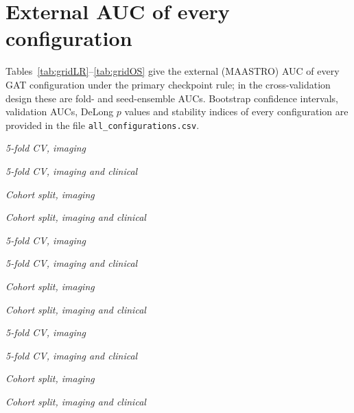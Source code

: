 \documentclass[11pt]{article}
\begin{document}
\section{External AUC of every configuration}

Tables~\ref{tab:gridLR}--\ref{tab:gridOS} give the external (MAASTRO) AUC of every GAT configuration under the primary checkpoint rule; in the cross-validation design these are fold- and seed-ensemble AUCs. Bootstrap confidence intervals, validation AUCs, DeLong $p$ values and stability indices of every configuration are provided in the file \texttt{all\_configurations.csv}.

\newcommand{\gridblock}[2]{\par\smallskip\noindent\textit{#1}\par\smallskip{\small}\par}

\begin{table}[!htb]
\centering
\caption{Locoregional recurrence: external AUC by feature-selection strategy and topology.}\label{tab:gridLR}
\gridblock{5-fold CV, imaging}{tabS_grid_LR_cv_img}
\gridblock{5-fold CV, imaging and clinical}{tabS_grid_LR_cv_clin}
\gridblock{Cohort split, imaging}{tabS_grid_LR_coh_img}
\gridblock{Cohort split, imaging and clinical}{tabS_grid_LR_coh_clin}
\end{table}

\begin{table}[!htb]
\centering
\caption{Distant metastasis: external AUC by feature-selection strategy and topology.}\label{tab:gridDM}
\gridblock{5-fold CV, imaging}{tabS_grid_DM_cv_img}
\gridblock{5-fold CV, imaging and clinical}{tabS_grid_DM_cv_clin}
\gridblock{Cohort split, imaging}{tabS_grid_DM_coh_img}
\gridblock{Cohort split, imaging and clinical}{tabS_grid_DM_coh_clin}
\end{table}

\begin{table}[!htb]
\centering
\caption{Overall survival: external AUC by feature-selection strategy and topology (no published feature set exists for OS).}\label{tab:gridOS}
\gridblock{5-fold CV, imaging}{tabS_grid_OS_cv_img}
\gridblock{5-fold CV, imaging and clinical}{tabS_grid_OS_cv_clin}
\gridblock{Cohort split, imaging}{tabS_grid_OS_coh_img}
\gridblock{Cohort split, imaging and clinical}{tabS_grid_OS_coh_clin}
\end{table}
\end{document}
